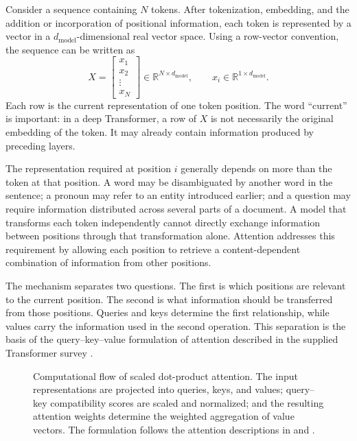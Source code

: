Consider a sequence containing \(N\) tokens. After tokenization, embedding,
and the addition or incorporation of positional information, each token is
represented by a vector in a \(d_{\mathrm{model}}\)-dimensional real vector
space. Using a row-vector convention, the sequence can be written as
\begin{equation}
    X =
    \begin{bmatrix}
        x_1\\
        x_2\\
        \vdots\\
        x_N
    \end{bmatrix}
    \in
    \mathbb{R}^{N\times d_{\mathrm{model}}},
    \qquad
    x_i\in\mathbb{R}^{1\times d_{\mathrm{model}}}.
    \label{eq:attn-input-matrix}
\end{equation}
Each row is the current representation of one token position. The word
``current'' is important: in a deep Transformer, a row of \(X\) is not
necessarily the original embedding of the token. It may already contain
information produced by preceding layers.

The representation required at position \(i\) generally depends on more than
the token at that position. A word may be disambiguated by another word in the
sentence; a pronoun may refer to an entity introduced earlier; and a question
may require information distributed across several parts of a document. A
model that transforms each token independently cannot directly exchange
information between positions through that transformation alone. Attention
addresses this requirement by allowing each position to retrieve a
content-dependent combination of information from other positions.

The mechanism separates two questions. The first is which positions are
relevant to the current position. The second is what information should be
transferred from those positions. Queries and keys determine the first
relationship, while values carry the information used in the second
operation. This separation is the basis of the query--key--value formulation
of attention described in the supplied Transformer survey
\parencite{ansar2024transformers}.

\begin{figure}[htbp]
    \centering
    
    \caption{Computational flow of scaled dot-product attention. The input
    representations are projected into queries, keys, and values; query--key
    compatibility scores are scaled and normalized; and the resulting
    attention weights determine the weighted aggregation of value vectors.
    The formulation follows the attention descriptions in
    \textcite{ansar2024transformers} and \textcite{dao2023flashattention2}.}
    \label{fig:attn-qkv-pipeline}
\end{figure}

